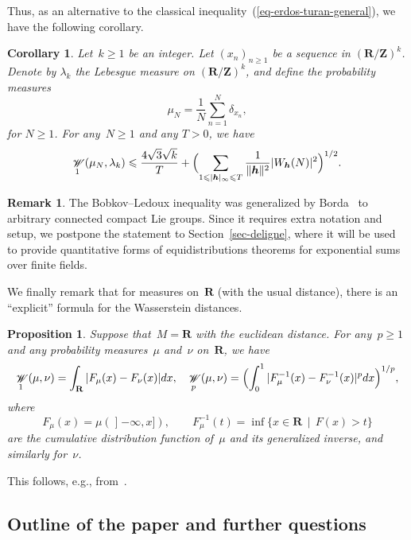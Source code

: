 \documentclass[12pt]{amsart}
\renewcommand{\mathcal}{\mathscr}
\renewcommand{\leq}{\leqslant}
\renewcommand{\geq}{\geqslant}
\newcommand{\uple}[1]{\text{\boldmath${#1}$}}
\newcommand{\Zz}{\mathbf{Z}}
\newcommand{\Rr}{\mathbf{R}}
\DeclareMathOperator{\wass}{\mathcal{W}}
\theoremstyle{plain}
\newtheorem{corollary}[theorem]{Corollary}
\newtheorem{proposition}[theorem]{Proposition}
\theoremstyle{remark}
\theoremstyle{definition}
\newtheorem{remark}[theorem]{Remark}
\renewcommand{\geq}{\geqslant}
\renewcommand{\leq}{\leqslant}
\begin{document}
Thus, as an alternative to the classical
inequality~(\ref{eq-erdos-turan-general}), we have the following
corollary.

\begin{corollary}\label{cor-wasserstein}
  Let~$k\geq 1$ be an integer.  Let $(x_n)_{n\geq 1}$ be a sequence in
  $(\Rr/\Zz)^k$. Denote by $\lambda_k$ the Lebesgue measure on
  $(\Rr/\Zz)^k$, and define the probability measures
  \[
    \mu_N=\frac{1}{N}\sum_{n=1}^N\delta_{x_n},
  \]
  for $N\geq 1$.  For any~$N\geq 1$ and any $T > 0$, we have
  \[
    \wass_1(\mu_N,\lambda_k)\leq \frac{4\sqrt{3}\sqrt{k}}{T}
    +\Bigl(\sum_{1\leq |\uple{h}|_{\infty}\leq T}
    \frac{1}{\|\uple{h}\|^2} |W_{\uple{h}}(N)|^2 \Bigr)^{1/2}.
  \]
\end{corollary}

\begin{remark}
  The Bobkov--Ledoux inequality was generalized by
  Borda~\cite{borda_berry_esseen} to arbitrary connected compact Lie
  groups. Since it requires extra notation and setup, we postpone the
  statement to Section~\ref{sec-deligne}, where it will be used to
  provide quantitative forms of equidistributions theorems for
  exponential sums over finite fields.
\end{remark}

We finally remark that for measures on~$\Rr$ (with the usual distance),
there is an ``explicit'' formula for the Wasserstein distances.

\begin{proposition}\label{pr-dim1}
  Suppose that~$M=\Rr$ with the euclidean distance. For any~$p\geq 1$
  and any probability measures~$\mu$ and~$\nu$ on~$\Rr$, we have
  \[
    \wass_1(\mu,\nu)=\int_{\Rr}
    |F_{\mu}(x)-F_{\nu}(x)|dx,\quad
    \wass_p(\mu,\nu)=\Bigl(\int_{0}^1
    |F^{-1}_{\mu}(x)-F^{-1}_{\nu}(x)|^pdx\Bigr)^{1/p},
  \]
  where
  \[
    F_{\mu}(x)=\mu(\mathopen]-\infty,x]),\quad\quad
    F_{\mu}^{-1}(t)=\inf\{x\in\Rr\,\mid\, F(x)>t\}
  \]
  are the cumulative distribution function of~$\mu$ and its
  generalized inverse, and similarly for~$\nu$.
\end{proposition}

This follows, e.g., from~\cite[Th.\,2.18,\,
Remark\,2.19\,(ii)]{villani}.


\subsection{Outline of the paper and further questions}
\end{document}
